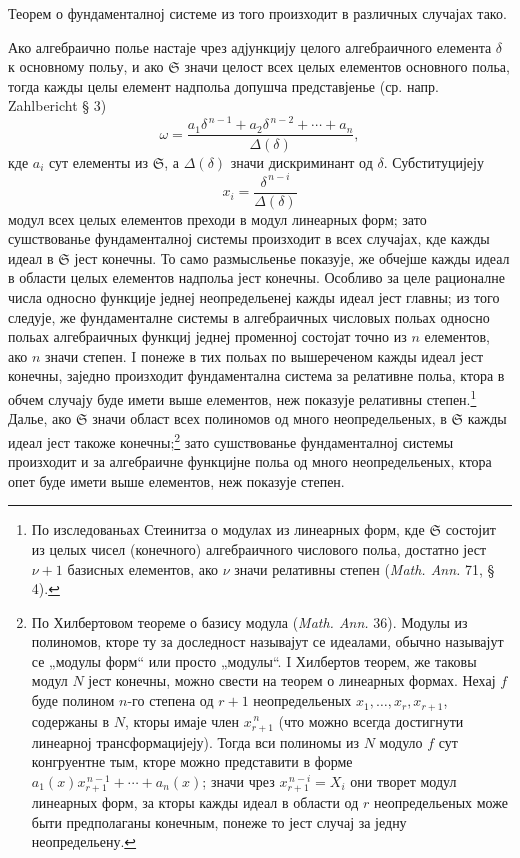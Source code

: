 ﻿\documentclass[11pt]{article}
\providecommand{\frS}{\mathfrak S}
\begin{document}
Теорем о фундаменталној системе из того произходит в различных случајах тако.

Ако алгебраично полье настаје чрез адјункцију целого алгебраичного елемента \(\delta\) к основному польу, и ако \(\frS\) значи целост всех целых елементов основного польа, тогда кажды целы елемент надпольа допушча представјенье (ср. напр. Zahlbericht § 3)
\[
\omega=\frac{a_1\delta^{\,n-1}+a_2\delta^{\,n-2}+\cdots+a_n}{\Delta(\delta)},
\]
кде \(a_i\) сут елементы из \(\frS\), а \(\Delta(\delta)\) значи дискриминант од \(\delta\). Субституцијеју
\[
x_i=\frac{\delta^{\,n-i}}{\Delta(\delta)}
\]
модул всех целых елементов преходи в модул линеарных форм; зато сушствованье фундаменталној системы произходит в всех случајах, кде кажды идеал в \(\frS\) јест конечны. То само размысльенье показује, же обчејше кажды идеал в области целых елементов надпольа јест конечны. Особливо за целе рационалне числа односно функције једнеј неопредельенеј кажды идеал јест главны; из того следује, же фундаменталне системы в алгебраичных числовых польах односно польах алгебраичных функциј једнеј променној состојат точно из \(n\) елементов, ако \(n\) значи степен. I понеже в тих польах по вышереченом кажды идеал јест конечны, заједно произходит фундаментална система за релативне польа, ктора в обчем случају буде имети выше елементов, неж показује релативны степен.\footnote{По изследованьах Стеинитза о модулах из линеарных форм, кде \(\frS\) состојит из целых чисел (конечного) алгебраичного числового польа, достатно јест \(\nu+1\) базисных елементов, ако \(\nu\) значи релативны степен (\emph{Math. Ann.} 71, § 4).} Далье, ако \(\frS\) значи област всех полиномов од много неопредельеных, в \(\frS\) кажды идеал јест такоже конечны;\footnote{По Хилбертовом теореме о базису модула (\emph{Math. Ann.} 36). Модулы из полиномов, кторе ту за доследност называјут се идеалами, обычно называјут се „модулы форм“ или просто „модулы“. I Хилбертов теорем, же таковы модул \(N\) јест конечны, можно свести на теорем о линеарных формах. Нехај \(f\) буде полином \(n\)-го степена од \(r+1\) неопредельеных \(x_1,\ldots,x_r,x_{r+1}\), содержаны в \(N\), кторы имаје член \(x_{r+1}^{\,n}\) (что можно всегда достигнути линеарној трансформацијеју). Тогда вси полиномы из \(N\) модуло \(f\) сут конгруентне тым, кторе можно представити в форме \(a_1(x)x_{r+1}^{\,n-1}+\cdots+a_n(x)\); значи чрез \(x_{r+1}^{\,n-i}=X_i\) они творет модул линеарных форм, за кторы кажды идеал в области од \(r\) неопредельеных може быти предполаганы конечным, понеже то јест случај за једну неопредельену.} зато сушствованье фундаменталној системы произходит и за алгебраичне функцијне польа од много неопредельеных, ктора опет буде имети выше елементов, неж показује степен.
\end{document}
